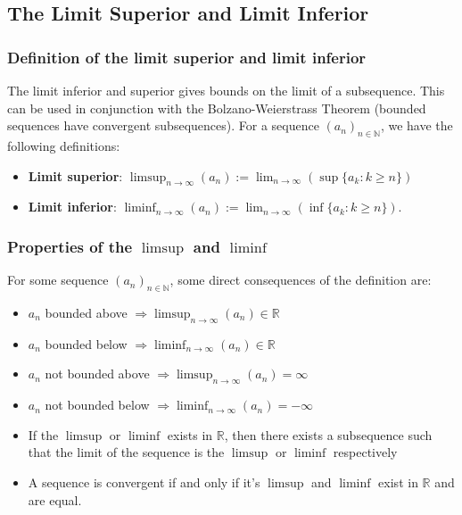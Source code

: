 \documentclass[a4paper, 12pt, twoside]{article}
\begin{document}
\subsection{The Limit Superior and Limit Inferior}

\subsubsection{Definition of the limit superior and limit inferior}

The limit inferior and superior gives bounds on the limit of a
subsequence. This can be used in conjunction with the
Bolzano-Weierstrass Theorem (bounded sequences have convergent
subsequences). For a sequence $(a_n)_{n \in \mathbb{N}}$, we
have the following definitions:

\begin{itemize}
      \item \textbf{Limit superior}: $\limsup_{n \to \infty}(a_n)
                  := \lim_{n \to \infty}(\sup\{a_k : k \geq n\})$
      \item \textbf{Limit inferior}: $\liminf_{n \to \infty}(a_n)
                  := \lim_{n \to \infty}(\inf\{a_k : k \geq n\})$.
\end{itemize}

\subsubsection{Properties of the $\limsup$ and $\liminf$}

For some sequence $(a_n)_{n \in \mathbb{N}}$, some direct consequences
of the definition are:

\begin{itemize}
      \item $a_n$ bounded above $\Rightarrow \limsup_{n\to\infty}(a_n)
                  \in \mathbb{R}$
      \item $a_n$ bounded below $\Rightarrow \liminf_{n\to\infty}(a_n)
                  \in \mathbb{R}$
      \item $a_n$ not bounded above $\Rightarrow \limsup_{n\to\infty}(a_n)
                  = \infty$
      \item $a_n$ not bounded below $\Rightarrow \liminf_{n\to\infty}(a_n)
                  = -\infty$
      \item If the $\limsup$ or $\liminf$ exists in $\mathbb{R}$, then there
            exists a subsequence such that the limit of the sequence is
            the $\limsup$ or $\liminf$ respectively
      \item A sequence is convergent if and only if it's $\limsup$ and $\liminf$
            exist in $\mathbb{R}$ and are equal.
\end{itemize}
\end{document}
